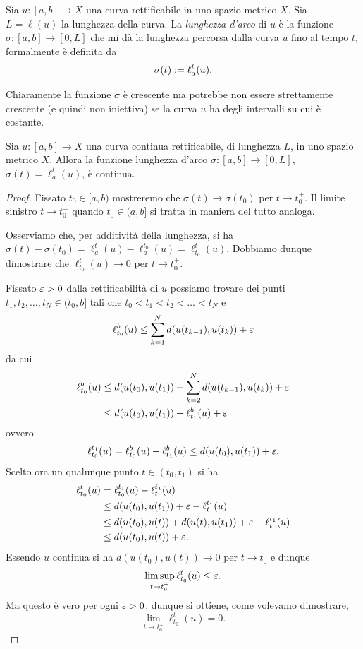 \begin{definition}
Sia $u \colon [a,b] \to X$ una curva rettificabile in uno spazio metrico $X$.
Sia $L = \ell(u)$ la lunghezza della curva.
La \emph{lunghezza d'arco} di $u$ è la funzione $\sigma\colon [a,b] \to [0,L]$ 
che mi dà la lunghezza percorsa dalla curva $u$ 
fino al tempo $t$, formalmente è definita da
\begin{equation}\label{def:lunghezza_arco}
  \sigma(t) := \ell_a^t(u).
\end{equation}
\end{definition}

Chiaramente la funzione $\sigma$ è crescente ma potrebbe non essere strettamente crescente 
(e quindi non iniettiva) se la curva $u$ ha degli intervalli su cui è costante.

\begin{theorem}
Sia $u \colon [a,b] \to X$ una curva continua rettificabile, di lunghezza $L$, 
in uno spazio metrico $X$.
Allora la funzione lunghezza d'arco $\sigma\colon [a,b] \to [0,L]$,
$\sigma(t) = \ell_a^t(u)$,
è continua.
\end{theorem}
\begin{proof}
Fissato $t_0\in [a,b)$
mostreremo che $\sigma(t)\to \sigma(t_0)$ per $t\to t_0^+$. Il limite sinistro $t\to t_0^-$ 
quando $t_0\in(a,b]$ si tratta 
in maniera del tutto analoga.

Osserviamo che, per additività della lunghezza, si ha 
$\sigma(t) - \sigma(t_0) = \ell_a^t(u) - \ell_a^{t_0}(u) = \ell_{t_0}^t(u)$.
Dobbiamo dunque dimostrare che $\ell_{t_0}^t(u) \to 0$ per $t\to t_0^+$.

Fissato $\varepsilon>0$ dalla rettificabilità di $u$ 
possiamo trovare dei punti $t_1, t_2, \dots, t_N \in (t_0,b]$
tali che $t_0 < t_1 < t_2 < \dots < t_N$ e
\[
\ell_{t_0}^b(u) 
\le \sum_{k=1}^N d(u(t_{k-1}), u(t_k)) + \varepsilon
\]
da cui
\begin{align*}
\ell_{t_0}^b(u) 
   &\le d(u(t_0), u(t_1)) + \sum_{k=2}^N d(u(t_{k-1}), u(t_k)) + \varepsilon \\
   &\le d(u(t_0), u(t_1)) + \ell_{t_1}^b(u) + \varepsilon
\end{align*}
ovvero
\[
  \ell_{t_0}^{t_1}(u) = \ell_{t_0}^b(u) - \ell_{t_1}^b(u) \le d(u(t_0), u(t_1)) + \varepsilon.
\]
Scelto ora un qualunque punto $t\in (t_0, t_1)$ si ha
\begin{align*}
  \ell_{t_0}^t(u) 
    &= \ell_{t_0}^{t_1}(u) - \ell_t^{t_1}(u) \\
    &\le d(u(t_0), u(t_1)) + \varepsilon - \ell_t^{t_1}(u) \\
    &\le d(u(t_0), u(t)) + d(u(t), u(t_1)) + \varepsilon - \ell_t^{t_1}(u) \\
    &\le d(u(t_0), u(t)) + \varepsilon.
\end{align*}
Essendo $u$ continua si ha $d(u(t_0), u(t)) \to 0$ per $t \to t_0$ 
e dunque
\[
\limsup_{t\to t_0^+} \ell_{t_0}^t(u) \le \varepsilon.
\]
Ma questo è vero per ogni $\varepsilon>0$, dunque si ottiene, come volevamo dimostrare,
\[
\lim_{t\to t_0^+} \ell_{t_0}^t(u) = 0.
\]
\end{proof}

